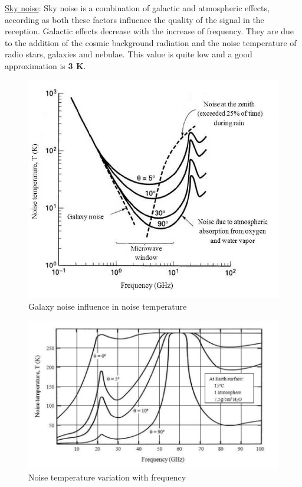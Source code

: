 \underline{Sky noise}: Sky noise is a combination of galactic and atmospheric effects, according as both these factors influence the quality of the signal in the reception. Galactic effects decrease with the increase of frequency. They are due to the addition of the cosmic background radiation and the noise temperature of radio stars, galaxies and nebulae. This value is quite low and a good approximation is \textbf{3 K}.
\begin{figure}[h]
	\includegraphics[scale=0.5]{./sections/SatelliteDept/sections/images/NoiseTemperature}
	\centering
	\caption{Galaxy noise influence in noise temperature \cite{Jorge2012}}
	\label{NoiseTemperature}
\end{figure}
\begin{figure}[h]
	\includegraphics[scale=0.55]{./sections/SatelliteDept/sections/images/NoiseTemperature2}
	\centering
	\caption{Noise temperature variation with frequency \cite{Jorge2012}}
	\label{NoiseTemperature2}
\end{figure}
